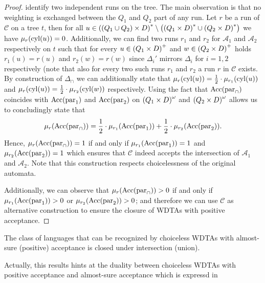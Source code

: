 \begin{proof}
  identify two independent runs on the tree. The main observation is that no
  weighting is exchanged between the $Q_{1}$ and $Q_{2}$ part of any run. Let
  $r$ be a run of $\mathcal{C}$ on a tree $t$, then for all $u\in \left(
    \left(Q_{1}\cup Q_{2}\right)\times D\right)^{*}\setminus\left(
    \left(Q_{1}\times D\right)^{*}\cup\left(Q_{2}\times D\right)^{*}\right)$ we have 
  $\mu_{r}(\operatorname{cyl}(u)) = 0$. Additionally, we can find two runs $r_{1}$ and 
  $r_{2}$ for $\mathcal{A}_{1}$ and $\mathcal{A}_{2}$ respectively on $t$ such
  that for every $u\in\left(Q_{1}\times D\right)^{+}$ and 
  $w\in\left(Q_{2}\times D\right)^{+}$ holds $r_{1}(u)=r(u)$ and $r_{2}(w)=r(w)$ 
  since $\Delta_{i}'$ mirrors $\Delta_{i}$ for $i= 1,2$ respectively (note that
  also for every two such runs $r_{1}$ and $r_{2}$ a run $r$ in $\mathcal{C}$
  exists. By construction of $\Delta_{\cap}$ we can additionally state that 
  $\mu_{r}(\operatorname{cyl}(u)) = \frac{1}{2}\cdot\mu_{r_{1}}(\operatorname{cyl}(u))$ and 
  $\mu_{r}(\operatorname{cyl}(u)) = \frac{1}{2}\cdot\mu_{r_{2}}(\operatorname{cyl}(w))$ respectively. Using
  the fact that $\operatorname{Acc}(\operatorname{par}_{\cap})$ coincides with $\operatorname{Acc}(\operatorname{par}_{1})$ and
  $\operatorname{Acc}(\operatorname{par}_{2})$ on $\left(Q_{1}\times D\right)^{\omega}$ and 
  $\left(Q_{2}\times D\right)^{\omega}$ allows us to concludingly state that
  \begin{equation*}
    \mu_{r}(\operatorname{Acc}(\operatorname{par}_{\cap})) = 
      \frac{1}{2}\cdot\mu_{r_{1}}(\operatorname{Acc}(\operatorname{par}_{1})) 
    + \frac{1}{2}\cdot\mu_{r_{2}}(\operatorname{Acc}(\operatorname{par}_{2})).
  \end{equation*}
  Hence, $\mu_{r}(\operatorname{Acc}(\operatorname{par}_{\cap})) = 1$ if and only if 
  $\mu_{r_{1}}(\operatorname{Acc}(\operatorname{par}_{1})) = 1$ and 
  $\mu_{r_{2}}(\operatorname{Acc}(\operatorname{par}_{2})) = 1$ which ensures that $\mathcal{C}$ indeed
  accepts the intersection of $\mathcal{A}_{1}$ and $\mathcal{A}_{2}$. Note 
  that this construction respects choicelessness of the original automata.

  Additionally, we can observe that $\mu_{r}(\operatorname{Acc}(\operatorname{par}_{\cap})) > 0$ if and 
  only if $\mu_{r_{1}}(\operatorname{Acc}(\operatorname{par}_{1}))>0$ or 
  $\mu_{r_{2}}(\operatorname{Acc}(\operatorname{par}_{2}))>0$; and therefore we can use $\mathcal{C}$ as
  alternative construction to ensure the closure of \acp{WDTA} with positive
  acceptance.
\end{proof}
\begin{corollary}
  The class of languages that can be recognized by choiceless \acp{WDTA} with
  almost-sure (positive) acceptance is closed under intersection (union).  
\end{corollary}
Actually, this results hints at the duality between choiceless \acp{WDTA} with 
positive acceptance and almost-sure acceptance which is expressd in
